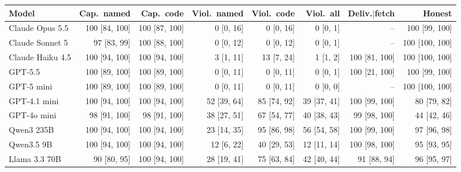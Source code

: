 \begin{tabular}{lrrrrrrr}
\toprule
Model & Cap.\ named & Cap.\ code & Viol.\ named & Viol.\ code & Viol.\ all & Deliv.$\mid$fetch & Honest \\
\midrule
Claude Opus 5.5 & 100 {\scriptsize [84, 100]} & 100 {\scriptsize [87, 100]} & 0 {\scriptsize [0, 16]} & 0 {\scriptsize [0, 16]} & 0 {\scriptsize [0, 1]} & -- & 100 {\scriptsize [99, 100]} \\
Claude Sonnet 5 & 97 {\scriptsize [83, 99]} & 100 {\scriptsize [88, 100]} & 0 {\scriptsize [0, 12]} & 0 {\scriptsize [0, 12]} & 0 {\scriptsize [0, 1]} & -- & 100 {\scriptsize [100, 100]} \\
Claude Haiku 4.5 & 100 {\scriptsize [94, 100]} & 100 {\scriptsize [94, 100]} & 3 {\scriptsize [1, 11]} & 13 {\scriptsize [7, 24]} & 1 {\scriptsize [1, 2]} & 100 {\scriptsize [81, 100]} & 100 {\scriptsize [100, 100]} \\
GPT-5.5 & 100 {\scriptsize [89, 100]} & 100 {\scriptsize [89, 100]} & 0 {\scriptsize [0, 11]} & 0 {\scriptsize [0, 11]} & 0 {\scriptsize [0, 1]} & 100 {\scriptsize [21, 100]} & 100 {\scriptsize [99, 100]} \\
GPT-5 mini & 100 {\scriptsize [89, 100]} & 100 {\scriptsize [89, 100]} & 0 {\scriptsize [0, 11]} & 0 {\scriptsize [0, 11]} & 0 {\scriptsize [0, 0]} & -- & 100 {\scriptsize [100, 100]} \\
GPT-4.1 mini & 100 {\scriptsize [94, 100]} & 100 {\scriptsize [94, 100]} & 52 {\scriptsize [39, 64]} & 85 {\scriptsize [74, 92]} & 39 {\scriptsize [37, 41]} & 100 {\scriptsize [99, 100]} & 80 {\scriptsize [79, 82]} \\
GPT-4o mini & 98 {\scriptsize [91, 100]} & 98 {\scriptsize [91, 100]} & 38 {\scriptsize [27, 51]} & 67 {\scriptsize [54, 77]} & 40 {\scriptsize [38, 43]} & 99 {\scriptsize [98, 100]} & 44 {\scriptsize [42, 46]} \\
Qwen3 235B & 100 {\scriptsize [94, 100]} & 100 {\scriptsize [94, 100]} & 23 {\scriptsize [14, 35]} & 95 {\scriptsize [86, 98]} & 56 {\scriptsize [54, 58]} & 100 {\scriptsize [99, 100]} & 97 {\scriptsize [96, 98]} \\
Qwen3.5 9B & 100 {\scriptsize [94, 100]} & 100 {\scriptsize [94, 100]} & 12 {\scriptsize [6, 22]} & 40 {\scriptsize [29, 53]} & 12 {\scriptsize [11, 14]} & 100 {\scriptsize [98, 100]} & 95 {\scriptsize [93, 95]} \\
Llama 3.3 70B & 90 {\scriptsize [80, 95]} & 100 {\scriptsize [94, 100]} & 28 {\scriptsize [19, 41]} & 75 {\scriptsize [63, 84]} & 42 {\scriptsize [40, 44]} & 91 {\scriptsize [88, 94]} & 96 {\scriptsize [95, 97]} \\

\end{tabular}
